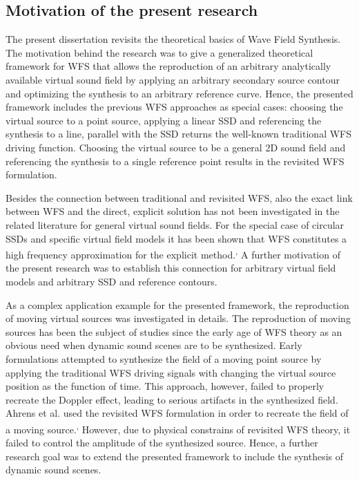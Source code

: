 \documentclass[10pt,twoside]{article}
\theoremstyle{thesisgroupstyle}
\theoremstyle{indented}
\begin{document}
\subsection{Motivation of the present research}
The present dissertation revisits the theoretical basics of Wave Field Synthesis.
The motivation behind the research was to give a generalized theoretical framework for WFS that allows the reproduction of an arbitrary analytically available virtual sound field by applying an arbitrary secondary source contour and optimizing the synthesis to an arbitrary reference curve.
Hence, the presented framework includes the previous WFS approaches as special cases: choosing the virtual source to a point source, applying a linear SSD and referencing the synthesis to a line, parallel with the SSD returns the well-known traditional WFS driving function.
Choosing the virtual source to be a general 2D sound field and referencing the synthesis to a single reference point results in the revisited WFS formulation.

Besides the connection between traditional and revisited WFS, also the exact link between WFS and the direct, explicit solution has not been investigated in the related literature for general virtual sound fields.
For the special case of circular SSDs and specific virtual field models it has been shown that WFS constitutes a high frequency approximation for the explicit method.\textsuperscript{,}	
A further motivation of the present research was to establish this connection for arbitrary virtual field models and arbitrary SSD and reference contours.

As a complex application example for the presented framework, the reproduction of moving virtual sources was investigated in details.
The reproduction of moving sources has been the subject of studies since the early age of WFS theory as an obvious need when dynamic sound scenes are to be synthesized.
Early formulations attempted to synthesize the field of a moving point source by applying the traditional WFS driving signals with changing the virtual source position as the function of time.
This approach, however, failed to properly recreate the Doppler effect, leading to serious artifacts in the synthesized field.
Ahrens et al. used the revisited WFS formulation in order to recreate the field of a moving source.\textsuperscript{,}
However, due to physical constrains of revisited WFS theory, it failed to control the amplitude of the synthesized source.
Hence, a further research goal was to extend the presented framework to include the synthesis of dynamic sound scenes.
\end{document}
